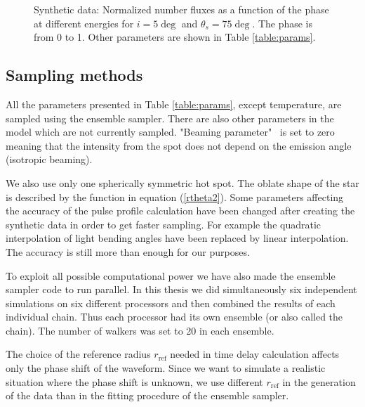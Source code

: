 \documentclass{wihuri}
\def\thetas{\theta_{s}}
\begin{document}
\begin{figure}
\centerline{}
\caption{Synthetic data: Normalized number fluxes as a function of the phase at different energies for $i = 5 \deg$ and $\thetas = 75 \deg$. The phase is from 0 to 1. Other parameters are shown in Table \ref{table:params}.
\label{fig:synteq2}}
\end{figure}


\subsection{Sampling methods}

All the parameters presented in Table \ref{table:params}, except temperature, are sampled using the ensemble sampler. There are also other parameters in the model which are not currently sampled. %
"Beaming parameter" \ is set to zero meaning that the intensity from the spot does not depend on the emission angle (isotropic beaming). 

We also use only one spherically symmetric hot spot. The oblate shape of the star is described by the function in equation (\ref{rtheta2}). Some parameters affecting the accuracy of the pulse profile calculation have been changed after creating the synthetic data in order to get faster sampling. For example the quadratic interpolation of light bending angles have been replaced by linear interpolation. The accuracy is still more than enough for our purposes. 

To exploit all possible computational power we have also made the ensemble sampler code to run parallel. In this thesis we did simultaneously six independent simulations on six different processors and then combined the results of each individual chain. Thus each processor had its own ensemble (or also called the chain). The number of walkers was set to 20 in each ensemble. 
 
The choice of the reference radius $r_{\mathrm{ref}}$ needed in time delay calculation affects only the phase shift of the waveform. Since we want to simulate a realistic situation where the phase shift is unknown, we use different $r_{\mathrm{ref}}$ in the generation of the data than in the fitting procedure of the ensemble sampler.  
\end{document}
